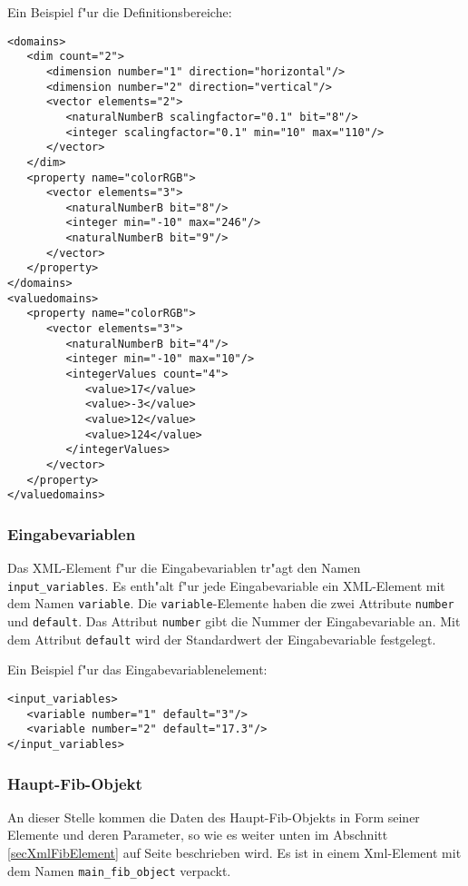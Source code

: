 \bigskip\noindent
Ein Beispiel f"ur die Definitionsbereiche:
\begin{verbatim}
<domains>
   <dim count="2">
      <dimension number="1" direction="horizontal"/>
      <dimension number="2" direction="vertical"/>
      <vector elements="2">
         <naturalNumberB scalingfactor="0.1" bit="8"/>
         <integer scalingfactor="0.1" min="10" max="110"/>
      </vector>
   </dim>
   <property name="colorRGB">
      <vector elements="3">
         <naturalNumberB bit="8"/>
         <integer min="-10" max="246"/>
         <naturalNumberB bit="9"/>
      </vector>
   </property>
</domains>
<valuedomains>
   <property name="colorRGB">
      <vector elements="3">
         <naturalNumberB bit="4"/>
         <integer min="-10" max="10"/>
         <integerValues count="4">
            <value>17</value>
            <value>-3</value>
            <value>12</value>
            <value>124</value>
         </integerValues>
      </vector>
   </property>
</valuedomains>
\end{verbatim}

\subsubsection{Eingabevariablen}
\label{secXmlRootInputVar}

Das XML-Element f"ur die Eingabevariablen tr"agt den Namen \verb|input_variables|. Es enth"alt f"ur jede Eingabevariable ein XML-Element mit dem Namen \verb|variable|. Die \verb|variable|-Elemente haben die zwei Attribute \verb|number| und \verb|default|. Das Attribut \verb|number| gibt die Nummer der Eingabevariable an. Mit dem Attribut \verb|default| wird der Standardwert der Eingabevariable festgelegt.

\bigskip\noindent
Ein Beispiel f"ur das Eingabevariablenelement:
\begin{verbatim}
<input_variables>
   <variable number="1" default="3"/>
   <variable number="2" default="17.3"/>
</input_variables>
\end{verbatim}


\subsubsection{Haupt-Fib-Objekt}
\label{secXmlRootMainObject}

An dieser Stelle kommen die Daten des Haupt-Fib-Objekts in Form seiner Elemente und deren Parameter, so wie es weiter unten im Abschnitt \ref{secXmlFibElement} auf Seite \pageref{secXmlFibElement} beschrieben wird. Es ist in einem Xml-Element mit dem Namen \verb|main_fib_object| verpackt.

